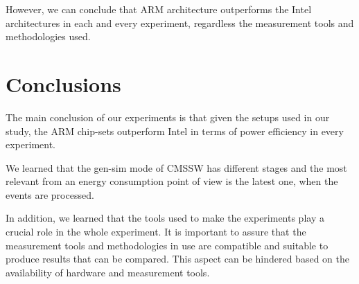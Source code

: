 However, we can conclude that ARM architecture outperforms the Intel architectures in each and every experiment, regardless the measurement tools and methodologies used.

\section{Conclusions}
The main conclusion of our experiments is that given the setups used in our study, the ARM chip-sets outperform Intel in terms of power efficiency in every experiment.

We learned that the gen-sim mode of CMSSW has different stages and the most relevant from an energy consumption point of view is the latest one, when the events are processed.


In addition, we learned that the tools used to make the experiments play a crucial role in the whole experiment. It is important to assure that the measurement tools and methodologies in use are compatible and suitable to produce results that can be compared. This aspect can be hindered based on the availability of hardware and measurement tools. 
